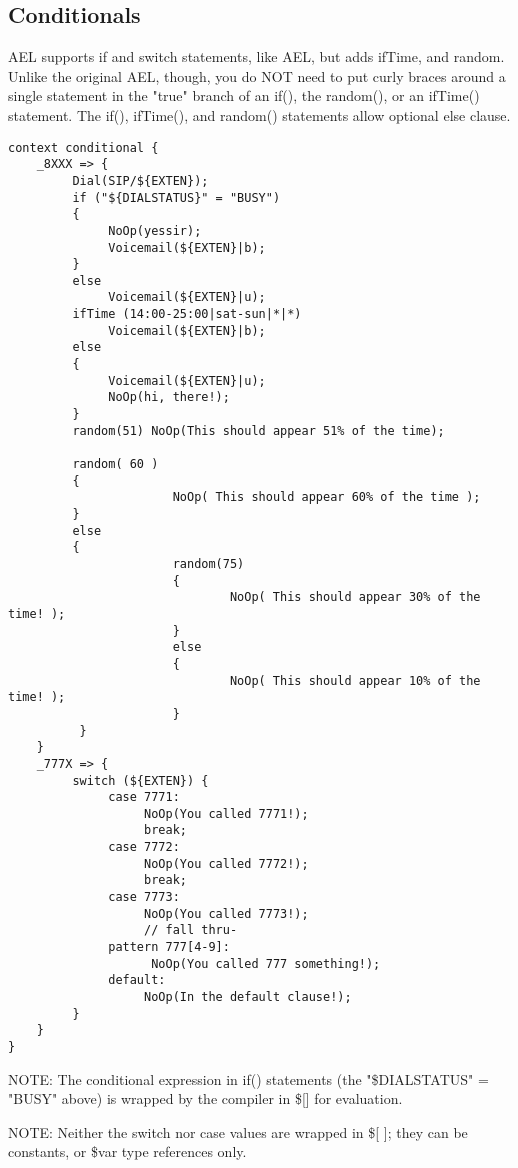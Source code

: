 {\subsection{Conditionals}

AEL supports if and switch statements, like AEL, but adds ifTime, and
random. Unlike the original AEL, though, you do NOT need to put curly
braces around a single statement in the "true" branch of an if(), the
random(), or an ifTime() statement. The if(), ifTime(), and random()
statements allow optional else clause.

\begin{verbatim}
context conditional {
    _8XXX => {
         Dial(SIP/${EXTEN});
         if ("${DIALSTATUS}" = "BUSY")
         {
              NoOp(yessir);
              Voicemail(${EXTEN}|b);
         }
         else
              Voicemail(${EXTEN}|u);
         ifTime (14:00-25:00|sat-sun|*|*) 
              Voicemail(${EXTEN}|b);
         else
         {
              Voicemail(${EXTEN}|u);
              NoOp(hi, there!);
         }
         random(51) NoOp(This should appear 51% of the time);

         random( 60 )
         {
                       NoOp( This should appear 60% of the time );
         }
         else
         {
                       random(75)
                       {
                               NoOp( This should appear 30% of the time! );
                       }
                       else
                       {
                               NoOp( This should appear 10% of the time! );
                       }
          }
    }
    _777X => {
         switch (${EXTEN}) {
              case 7771:
                   NoOp(You called 7771!);
                   break;
              case 7772:
                   NoOp(You called 7772!);
                   break;
              case 7773:
                   NoOp(You called 7773!);
                   // fall thru-
              pattern 777[4-9]:
                    NoOp(You called 777 something!);
              default:
                   NoOp(In the default clause!);
         }
    }
}
\end{verbatim}

NOTE: The conditional expression in if() statements (the
      "\${DIALSTATUS}" = "BUSY" above) is wrapped by the compiler in 
      \$[] for evaluation.

NOTE: Neither the switch nor case values are wrapped in \$[ ]; they can
      be constants, or \${var} type references only.

}
